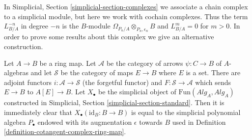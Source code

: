 \noindent
In Simplicial, Section \ref{simplicial-section-complexes} we associate a
chain complex to a simplicial module, but here we work with cochain complexes.
Thus the term $L_{B/A}^{-n}$ in degree $-n$ is the $B$-module
$\Omega_{P_n/A} \otimes_{P_n, \epsilon_n} B$ and $L_{B/A}^m = 0$
for $m > 0$. In order to prove some results about this complex
we give an alternative construction.

\begin{remark}
\label{remark-variant-cotangent-complex}
Let $A \to B$ be a ring map. Let $\mathcal{A}$ be the category of
arrows $\psi : C \to B$ of $A$-algebras and let $\mathcal{S}$ be
the category of maps $E \to B$ where $E$ is a set. There are adjoint
functors $i : \mathcal{A} \to \mathcal{S}$ (the forgetful functor)
and $F : \mathcal{S} \to \mathcal{A}$ which sends $E \to B$ to
$A[E] \to B$. Let $X_\bullet$ be the simplicial object of
$\text{Fun}(\textit{Alg}_A, \textit{Alg}_A)$ constructed in
Simplicial, Section \ref{simplicial-section-standard}.
Then it is immediately clear that $X_\bullet(\text{id}_B : B \to B)$
is equal to the simplicial polynomial algebra $P_\bullet$
endowed with its augmentation $\epsilon$ towards $B$
used in Definition \ref{definition-cotangent-complex-ring-map}.
\end{remark}

